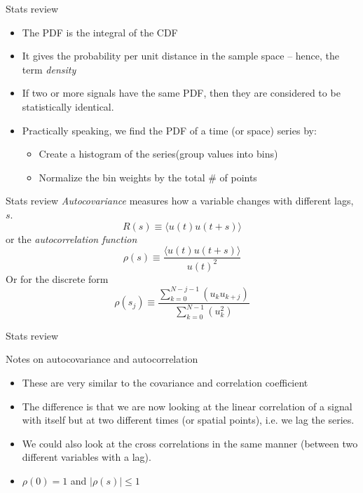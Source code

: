 \begin{frame}{Stats review}
\begin{itemize}
	\item The PDF is the integral of the CDF	
	\item It gives the probability per unit distance in the sample space -- hence, the term \textit{density}
	\item If two or more signals have the same PDF, then they are considered to be statistically identical.
	\item Practically speaking, we find the PDF of a time (or space) series by:
	\begin{itemize}
  	\item Create a histogram of the series(group values into bins)
  	\item Normalize the bin weights by the total \# of points
  \end{itemize}
\end{itemize}

\end{frame}

\begin{frame}{Stats review}
\textit{Autocovariance} measures how a variable changes with different lags, $s$.
  $$R(s) \equiv \langle u(t) u(t+s)\rangle$$
  or the \textit{autocorrelation function}
  $$\rho(s) \equiv \frac{ \langle u(t)u(t+s)\rangle}{u(t)^2}$$
  Or for the discrete form
  $$\rho(s_j) \equiv \frac{ \sum^{N-j-1}_{k=0}(u_ku_{k+j})}{\sum^{N-1}_{k=0}(u_k^2)}$$
\end{frame}


\begin{frame}{Stats review}
  
  Notes on autocovariance and autocorrelation
  \begin{itemize}
  	\item These are very similar to the covariance and correlation coefficient
  	\item The difference is that we are now looking at the linear correlation of a signal with itself but at two different times (or spatial points), i.e. we lag the series.
  	\item We could also look at the cross correlations in the same manner (between two different variables with a lag).
  	\item $\rho(0) = 1$ and $|\rho(s)| \leq 1$
  \end{itemize}
  
\end{frame}

